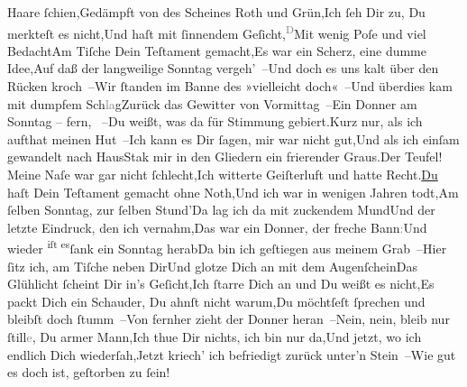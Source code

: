 \begin{ledgroupsized}[t]{13cm}
                  Haare ſchien,\newverse{}Gedämpft von des Scheines Roth und Grün,\newverse{}Ich ſeh Dir zu, Du merkteſt es nicht,\newverse{}Und haſt mit ſinnendem Geſicht,\newverse{}\substVorne{}\textsuperscript{\textcolor{gray}{D}}\substDazwischen{}M\substHinten{}it wenig Poſe und viel Bedacht\newverse{}Am Tiſche Dein Teſtament gemacht,\newverse{}Es war ein Scherz, eine dumme Idee,\newverse{}Auf daß der langweilige Sonntag vergeh’ –\newverse{}Und doch es uns kalt über den Rücken kroch –\newverse{}Wir ſtanden im Banne des »vielleicht doch« –\newverse{}Und überdies kam mit dumpfem Sch\textcolor{gray}{la}g\newverse{}Zurück das Gewitter von Vormittag –\newverse{}Ein Donner am Sonntag – fern, \label{K_L02647-1v}\label{K_L02647-1h} –\newverse{}Du weißt, was da für Stimmung gebiert.\newverse{}{\pb}Kurz nur, als ich aufthat meinen Hut –\newverse{}Ich kann es Dir ſagen, mir war nicht gut,\newverse{}Und als ich einſam gewandelt nach Haus\newverse{}Stak mir in den Gliedern ein frierender Graus.\newverse{}Der Teufel! Meine Naſe war gar nicht ſchlecht,\newverse{}Ich witterte Geiſterluft und hatte Recht.\newverse{}\uline{Du} haſt Dein Teſtament gemacht ohne Noth,\newverse{}Und ich war in wenigen Jahren todt,\newverse{}Am ſelben Sonntag, zur ſelben Stund’\newverse{}Da lag ich da mit zuckendem Mund\newverse{}Und der letzte Eindruck, den ich vernahm,\newverse{}Das war ein Donner, der freche Bann\textcolor{gray}{:}\newverse{}Und wieder \substVorne{}\textsuperscript{iſt es}{\allowbreak}\substDazwischen{}ſank\substHinten{} ein Sonntag herab\newverse{}Da bin ich geſtiegen aus meinem Grab –\newverse{}Hier ſitz ich, am Tiſche neben Dir\newverse{}Und glotze Dich an mit dem Augenſchein\newverse{}Das Glühlicht ſcheint Dir in’s Geſicht,\newverse{}Ich ſtarre Dich an und Du weißt es nicht,\newverse{}{\pb}Es packt Dich ein Schauder, Du  ahnſt nicht warum,\newverse{}Du möchtſeſt ſprechen und bleibſt doch ſtumm –\newverse{}Von fernher zieht der Donner heran –\newverse{}Nein, nein, bleib nur ſtill\textcolor{gray}{e}, Du armer Mann,\newverse{}Ich thue Dir nichts, ich bin nur da,\newverse{}Und jetzt, wo ich endlich Dich wiederſah,\newverse{}Jetzt kriech’ ich befriedigt zurück unter’n Stein –\newverse{}Wie gut es doch ist, geſtorben zu ſein!\stanzaend{}
         
         \endnumbering{}\end{ledgroupsized}  \newcommand{\dateiname}{L02647}\newcommand{\titel}{Paul Goldmann an Arthur Schnitzler, [27. 4. 1890]}\newcommand{\editorInnen}{Martin Anton Müller und Laura Untner}
      